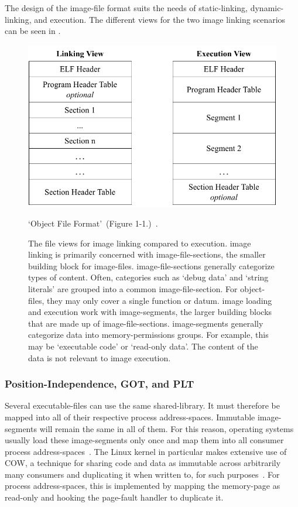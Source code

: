 The design of the \gls{image-file} format suits the needs of \gls{static-linking}, \gls{dynamic-linking}, and execution. The different views for the two \gls{image} linking scenarios can be seen in .

\begin{figure}[htb]
  \centering
  \includegraphics{Figures/ELF.pdf}
  \caption{`Object File Format'~(Figure 1-1.)~\cite{elf-spec}.}
  \label{fig:elf_link_exe}
  \caption*{The  file views for \gls{image} linking compared to execution. \Gls{image} linking is primarily concerned with \glspl{image-file-section}, the smaller building block for \glspl{image-file}. \Glspl{image-file-section} generally categorize types of content. Often, categories such as `debug data' and `string literals' are grouped into a common \gls{image-file-section}. For \glspl{object-file}, they may only cover a single function or datum. \Gls{image} loading and execution work with \glspl{image-segment}, the larger building blocks that are made up of \glspl{image-file-section}. \Glspl{image-segment} generally categorize data into \gls{memory-permissions} groups. For example, this may be `executable code' or `read-only data'. The content of the data is not relevant to \gls{image} execution.}
\end{figure}

\subsubsection{Position-Independence, GOT, and PLT}

Several \glspl{executable-file} can use the same \gls{shared-library}. It must therefore be mapped into all of their respective process \glspl{address-space}. Immutable \glspl{image-segment} will remain the same in all of them. For this reason, operating systems usually load these \glspl{image-segment} only once and map them into all consumer process \glspl{address-space}~\cite{ms-dll-base-addr,xnu,linux}. The Linux kernel in particular makes extensive use of \gls{COW}, a technique for sharing code and data as immutable across arbitrarily many consumers and duplicating it when written to, for such purposes~\cite{linux}. For process \glspl{address-space}, this is implemented by mapping the \gls{memory-page} as read-only and hooking the \gls{page-fault} handler to duplicate it.

